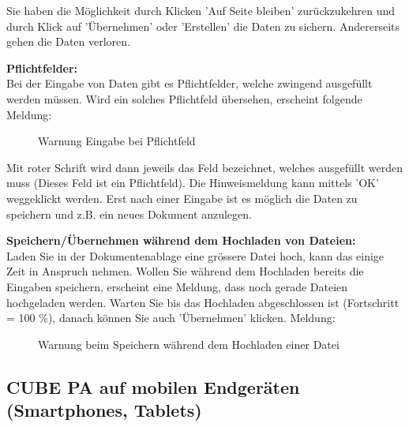 \vspace{\baselineskip}

Sie haben die Möglichkeit durch Klicken 'Auf Seite bleiben' zurückzukehren und durch Klick auf 'Übernehmen' oder 'Erstellen' die Daten zu sichern. Andererseits gehen die Daten verloren.

\vspace{\baselineskip}

\textbf{Pflichtfelder:}\\
Bei der Eingabe von Daten gibt es Pflichtfelder, welche zwingend ausgefüllt werden müssen. Wird ein solches Pflichtfeld übersehen, erscheint folgende Meldung:

\begin{figure}[H]
\caption{Warnung Eingabe bei Pflichtfeld}
\end{figure}

Mit roter Schrift wird dann jeweils das Feld bezeichnet, welches ausgefüllt werden muss (Dieses Feld ist ein Pflichtfeld). Die Hinweismeldung kann mittels 'OK' weggeklickt werden. Erst nach einer Eingabe ist es möglich die Daten zu speichern und z.B. ein neues Dokument anzulegen. 

\vspace{\baselineskip}

\textbf{Speichern/Übernehmen während dem Hochladen von Dateien:}\\
Laden Sie in der Dokumentenablage eine grössere Datei hoch, kann das einige Zeit in Anspruch nehmen. Wollen Sie während dem Hochladen bereits die Eingaben speichern, erscheint eine Meldung, dass noch gerade Dateien hochgeladen werden. Warten Sie bis das Hochladen abgeschlossen ist (Fortschritt = 100 \%), danach können Sie auch 'Übernehmen' klicken. Meldung:

\begin{figure}[H]
\caption{Warnung beim Speichern während dem Hochladen einer Datei}
\end{figure}


\pagebreak
\subsection{CUBE PA auf mobilen Endgeräten (Smartphones, Tablets)}

